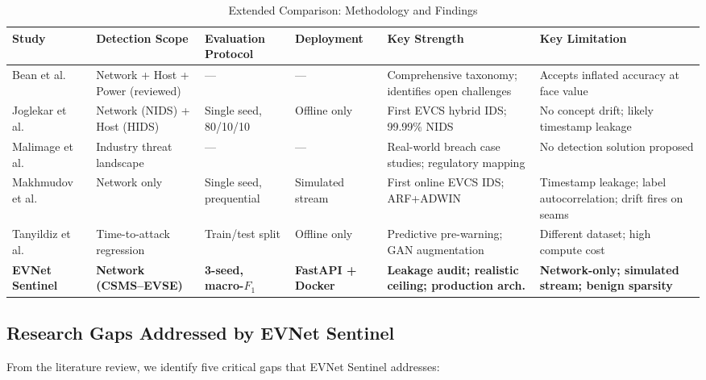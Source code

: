 \documentclass[conference]{IEEEtran}
\begin{document}
\begin{table}[htbp]
\caption{Extended Comparison: Methodology and Findings}
\centering
\small
\begin{tabular}{p{2.4cm}p{2.3cm}p{2.0cm}p{2.0cm}p{2.3cm}p{2.5cm}}
\toprule
\textbf{Study} & \textbf{Detection Scope} & \textbf{Evaluation Protocol} & \textbf{Deployment} & \textbf{Key Strength} & \textbf{Key Limitation} \\
\midrule
Bean et al.\ \cite{b1} & Network + Host + Power (reviewed) & --- & --- & Comprehensive taxonomy; identifies open challenges & Accepts inflated accuracy at face value \\
Joglekar et al.\ \cite{b2} & Network (NIDS) + Host (HIDS) & Single seed, 80/10/10 & Offline only & First EVCS hybrid IDS; 99.99\% NIDS & No concept drift; likely timestamp leakage \\
Malimage et al.\ \cite{b3} & Industry threat landscape & --- & --- & Real-world breach case studies; regulatory mapping & No detection solution proposed \\
Makhmudov et al.\ \cite{b4} & Network only & Single seed, prequential & Simulated stream & First online EVCS IDS; ARF+ADWIN & Timestamp leakage; label autocorrelation; drift fires on seams \\
Tanyildiz et al.\ \cite{b5} & Time-to-attack regression & Train/test split & Offline only & Predictive pre-warning; GAN augmentation & Different dataset; high compute cost \\
\midrule
\textbf{EVNet Sentinel} & \textbf{Network (CSMS--EVSE)} & \textbf{3-seed, macro-$F_1$} & \textbf{FastAPI + Docker} & \textbf{Leakage audit; realistic ceiling; production arch.} & \textbf{Network-only; simulated stream; benign sparsity} \\
\bottomrule
\end{tabular}
\label{tab:comparison_ext}
\end{table}

\subsection{Research Gaps Addressed by EVNet Sentinel}

From the literature review, we identify five critical gaps that EVNet Sentinel addresses:
\end{document}
